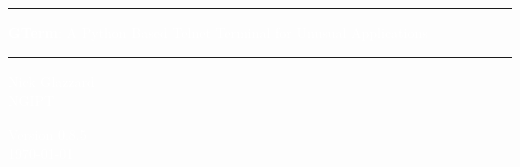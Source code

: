 \documentclass[a4paper,twoside,11pt]{article}
\begin{document}
\begin{titlepage}
\pagecolor{titlepagecolor}

\vspace*{25mm}
{\color{white} \noindent \rule{\textwidth}{3mm}}
\begin{center}
\Huge
\textcolor{white}{\textbf{GTerm}: A Python Based Telnet Terminal for Unusual Applications}
\end{center}
\vspace*{2mm}
{\color{white} \noindent \rule{\textwidth}{3mm}}

\vspace*{6cm}

\begin{center}
\Large 
\textcolor{white}{
Nick Glazzard\\
NGIPT\\
}
\end{center}

\vspace*{2cm}

\begin{center}
\Large 
\textcolor{white}{
Version 0.8.5\\
\today
}
\end{center}

\end{titlepage}

\pagecolor{white}






\end{document}
